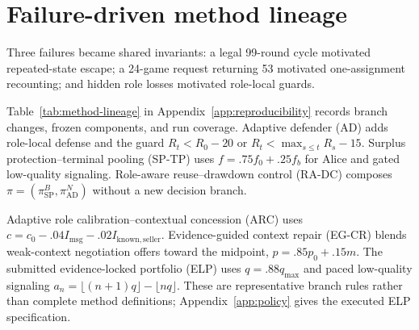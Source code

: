 \section{Failure-driven method lineage}

Three failures became shared invariants: a legal 99-round cycle motivated
repeated-state escape; a 24-game request returning 53 motivated one-assignment
recounting; and hidden role losses motivated role-local guards.

Table~\ref{tab:method-lineage} in Appendix~\ref{app:reproducibility} records branch changes, frozen components, and
run coverage. Adaptive defender (AD) adds role-local defense and the guard
$R_t<R_0-20$ or $R_t<\max_{s\leq t}R_s-15$. Surplus protection--terminal
pooling (SP-TP) uses $f=.75f_0+.25f_b$ for Alice and gated low-quality
signaling. Role-aware reuse--drawdown control (RA-DC) composes
$\pi=(\pi_{\mathrm{SP}}^{B},\pi_{\mathrm{AD}}^{N})$ without a new decision branch.

Adaptive role calibration--contextual concession (ARC) uses
$c=c_0-.04I_{\mathrm{msg}}-.02I_{\mathrm{known,seller}}$.
Evidence-guided context repair (EG-CR) blends weak-context negotiation offers
toward the midpoint, $p=.85p_0+.15m$. The submitted evidence-locked portfolio
(ELP) uses $q=.88q_{\max}$ and paced low-quality signaling
$a_n=\lfloor(n+1)q\rfloor-\lfloor nq\rfloor$. These are representative branch
rules rather than complete method definitions; Appendix~\ref{app:policy} gives
the executed ELP specification.
